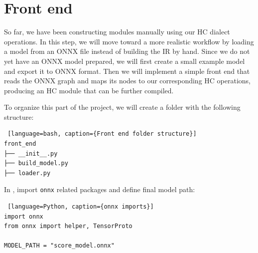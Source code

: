 \documentclass[../main.tex]{subfiles}
\begin{document}
\section{Front end}
So far, we have been constructing modules manually using our HC dialect operations.
In this step, we will move toward a more realistic workflow by loading a model from
an ONNX file instead of building the IR by hand. Since we do not yet have
an ONNX model prepared, we will first create a small example model and export
it to ONNX format. Then we will implement a simple front end that reads the ONNX
graph and maps its nodes to our corresponding HC operations, producing an HC module
that can be further compiled.

To organize this part of the project, we will create a folder with the following structure:
\begin{lstlisting} [language=bash, caption={Front end folder structure}]
front_end
├── __init__.py
├── build_model.py
├── loader.py
\end{lstlisting}

In , import \texttt{onnx} related packages and define final model path:
\begin{lstlisting} [language=Python, caption={onnx imports}]
import onnx
from onnx import helper, TensorProto

MODEL_PATH = "score_model.onnx"
\end{lstlisting}
\end{document}
